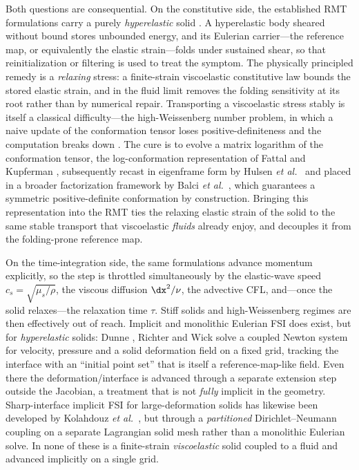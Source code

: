 Both questions are consequential. On the constitutive side, the established RMT
formulations carry a purely \emph{hyperelastic} solid \cite{Kamrin2012,Rycroft2020,Jain2019}.
A hyperelastic body sheared without bound stores unbounded energy, and its Eulerian
carrier---the reference map, or equivalently the elastic strain---folds under sustained
shear, so that reinitialization or filtering is used to treat the symptom. The
physically principled remedy is a \emph{relaxing} stress: a finite-strain viscoelastic
constitutive law bounds the stored elastic strain, and in the fluid limit removes the
folding sensitivity at its root rather than by numerical repair. Transporting a
viscoelastic stress stably is itself a classical difficulty---the high-Weissenberg
number problem, in which a naive update of the conformation tensor loses
positive-definiteness and the computation breaks down \cite{Oldroyd1950,Bird1987}.
The cure is to evolve a matrix logarithm of the conformation tensor, the
log-conformation representation of Fattal and Kupferman \cite{Fattal2004,Fattal2005},
subsequently recast in eigenframe form by Hulsen \emph{et al.}\ \cite{Hulsen2005} and
placed in a broader factorization framework by Balci \emph{et al.}\ \cite{Balci2011},
which guarantees a symmetric positive-definite conformation by construction. Bringing
this representation into the RMT ties the relaxing elastic strain of the solid to the
same stable transport that viscoelastic \emph{fluids} already enjoy, and decouples it
from the folding-prone reference map.

On the time-integration side, the same formulations advance momentum explicitly, so
the step is throttled simultaneously by the elastic-wave speed $c_s=\sqrt{\mu_s/\rho}$,
the viscous diffusion $\dx^2/\nu$, the advective CFL, and---once the solid relaxes---the
relaxation time $\tau$. Stiff solids and high-Weissenberg regimes are then effectively
out of reach. Implicit and monolithic Eulerian FSI does exist, but for
\emph{hyperelastic} solids: Dunne \cite{Dunne2006}, Richter \cite{Richter2013,Richter2017}
and Wick \cite{Wick2013} solve a coupled Newton system for velocity, pressure and a
solid deformation field on a fixed grid, tracking the interface with an ``initial point
set'' that is itself a reference-map-like field. Even there the deformation/interface is
advanced through a separate extension step outside the Jacobian, a treatment that is not
\emph{fully} implicit in the geometry. Sharp-interface implicit FSI for large-deformation
solids has likewise been developed by Kolahdouz \emph{et al.}\ \cite{Kolahdouz2023}, but
through a \emph{partitioned} Dirichlet--Neumann coupling on a separate Lagrangian solid
mesh rather than a monolithic Eulerian solve. In none of these is a finite-strain
\emph{viscoelastic} solid coupled to a fluid and advanced implicitly on a single grid.

